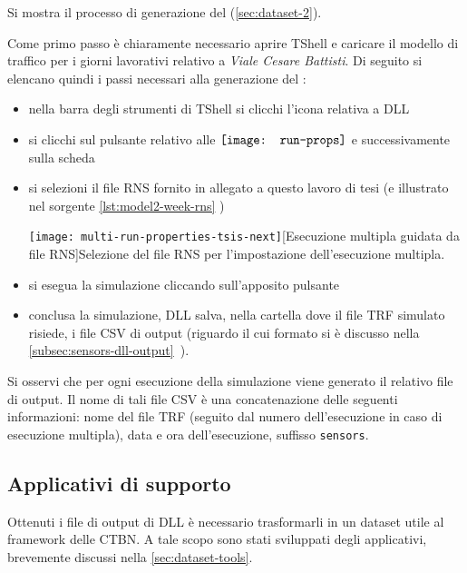 Si mostra il processo di generazione del  (\vref{sec:dataset-2}).

Come primo passo è chiaramente necessario aprire \acs{TShell} e caricare il modello di traffico per i giorni lavorativi relativo a \emph{Viale Cesare Battisti}. Di seguito si elencano quindi i passi necessari alla generazione del :
\begin{itemize}
	\item nella barra degli strumenti di \acs{TShell} si clicchi l'icona relativa a  \acs{DLL}
	\item si clicchi sul pulsante relativo alle \emph{} $\vcenter{\hbox{\texttt{[image: run-props]}}}$ e successivamente sulla scheda \emph{}
	\item si selezioni il file \acs{RNS} fornito in allegato a questo lavoro di tesi (e illustrato nel sorgente \ref{lst:model2-week-rns} )\par
	\begin{minipage}{\linewidth}
		\centering
		\texttt{[image: multi-run-properties-tsis-next]}[Esecuzione multipla guidata da file \acs{RNS}]{Selezione del file \acs{RNS} per l'impostazione dell'esecuzione multipla.}\label{fig:multi-run-properties-tsis-next}
	\end{minipage}
	\item si esegua la simulazione cliccando sull'apposito pulsante
	\item conclusa la simulazione,  \acs{DLL} salva, nella cartella dove il file \acs{TRF} simulato risiede, i file \acs{CSV} di output (riguardo il cui formato si è discusso nella \autoref{subsec:sensors-dll-output}~).
\end{itemize}

Si osservi che per ogni esecuzione della simulazione viene generato il relativo file di output. Il nome di tali file \acs{CSV} è una concatenazione delle seguenti informazioni: nome del file \acs{TRF} (seguito dal numero dell'esecuzione in caso di esecuzione multipla), data e ora dell'esecuzione, suffisso \lstinline[]|sensors|.

\subsection{Applicativi di supporto}
Ottenuti i file di output di  \acs{DLL} è necessario trasformarli in un dataset utile al framework delle \acs{CTBN}. A tale scopo sono stati sviluppati degli applicativi, brevemente discussi nella \vref{sec:dataset-tools}.

